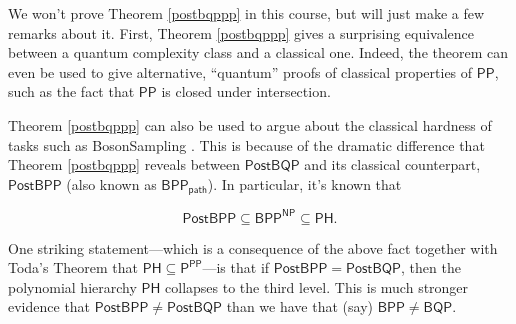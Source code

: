 \documentclass[11pt]{report}
\theoremstyle{plain}
\theoremstyle{definition}
\begin{document}
We won't prove Theorem \ref{postbqppp} in this course, but will just make a few remarks about it.  First, Theorem \ref{postbqppp} gives a surprising equivalence between a quantum complexity class and a classical one.  Indeed, the theorem can even be used to give alternative, ``quantum'' proofs of classical properties of $\mathsf{PP}$, such as the fact that $\mathsf{PP}$ is closed under intersection.

Theorem \ref{postbqppp} can also be used to argue about the classical hardness of tasks such as BosonSampling \cite{aark}.  This is because of the dramatic difference that Theorem \ref{postbqppp} reveals between $\mathsf{PostBQP}$ and its classical counterpart, $\mathsf{PostBPP}$ (also known as $\mathsf{BPP_{path}}$).  In particular, it's known that

$$\mathsf{PostBPP} \subseteq \mathsf{BPP^{NP}} \subseteq \mathsf{PH}.$$

One striking statement---which is a consequence of the above fact together with Toda's Theorem \cite{toda} that $\mathsf{PH}\subseteq\mathsf{P^{PP}}$---is that if $\mathsf{PostBPP}=\mathsf{PostBQP}$, then the polynomial hierarchy $\mathsf{PH}$ collapses to the third level.  This is much stronger evidence that $\mathsf{PostBPP}\neq \mathsf{PostBQP}$ than we have that (say) $\mathsf{BPP}\neq \mathsf{BQP}$.
\end{document}
